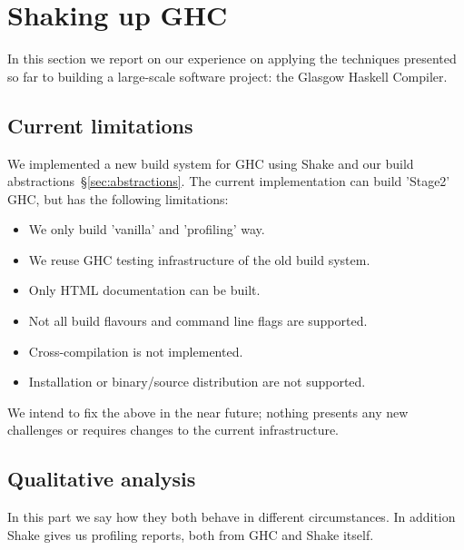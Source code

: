 \section{Shaking up GHC\label{sec:ghc}}

In this section we report on our experience on applying the techniques presented
so far to building a large-scale software project: the Glasgow Haskell Compiler.

\subsection{Current limitations\label{sec:limitations}}

We implemented a new build system for GHC using Shake and our build
abstractions~\S\ref{sec:abstractions}. The current implementation can build
\lst'Stage2' GHC, but has the following limitations:
\begin{itemize}
  \item We only build \lst'vanilla' and \lst'profiling' way.
  \item We reuse GHC testing infrastructure of the old build system.
  \item Only HTML documentation can be built.
  \item Not all build flavours and command line flags are supported.
  \item Cross-compilation is not implemented.
  \item Installation or binary/source distribution are not supported.
\end{itemize}

\noindent We intend to fix the above in the near future; nothing presents any
new challenges or requires changes to the current infrastructure.

\subsection{Qualitative analysis}

In this part we say how they both behave in different circumstances. In addition Shake gives us profiling reports, both from GHC and Shake itself.


